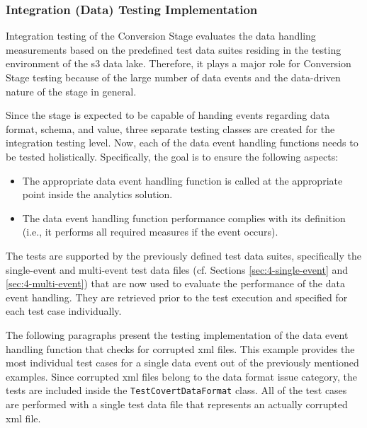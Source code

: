 \subsubsection{Integration (Data) Testing Implementation}
Integration testing of the Conversion Stage evaluates the data handling measurements based on the predefined test data suites residing in the testing environment of the \ac{s3} data lake. Therefore, it plays a major role for Conversion Stage testing because of the large number of data events and the data-driven nature of the stage in general.

Since the stage is expected to be capable of handing events regarding data format, schema, and value, three separate testing classes are created for the integration testing level. Now, each of the data event handling functions needs to be tested holistically. Specifically, the goal is to ensure the following aspects:

\begin{itemize}
	\item The appropriate data event handling function is called at the appropriate point inside the analytics solution.
	\item The data event handling function performance complies with its definition (i.e., it performs all required measures if the event occurs).
\end{itemize}

The tests are supported by the previously defined test data suites, specifically the single-event and multi-event test data files (cf. Sections \ref{sec:4-single-event} and \ref{sec:4-multi-event}) that are now used to evaluate the performance of the data event handling. They are retrieved prior to the test execution and specified for each test case individually.

The following paragraphs present the testing implementation of the data event handling function that checks for corrupted \ac{xml} files. This example provides the most individual test cases for a single data event out of the previously mentioned examples. Since corrupted \ac{xml} files belong to the data format issue category, the tests are included inside the \texttt{TestCovertDataFormat} class. All of the test cases are performed with a single test data file that represents an actually corrupted \ac{xml} file.

